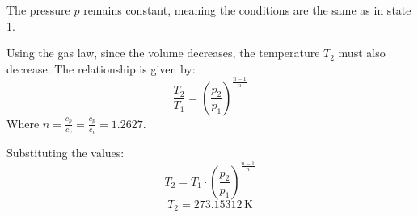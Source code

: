 The pressure \( p \) remains constant, meaning the conditions are the same as in state 1.  

Using the gas law, since the volume decreases, the temperature \( T_2 \) must also decrease. The relationship is given by:  
\[
\frac{T_2}{T_1} = \left(\frac{p_2}{p_1}\right)^{\frac{n-1}{n}}
\]  
Where \( n = \frac{c_p}{c_v} = \frac{c_p}{c_v} = 1.2627 \).  

Substituting the values:  
\[
T_2 = T_1 \cdot \left(\frac{p_2}{p_1}\right)^{\frac{n-1}{n}}
\]  
\[
T_2 = 273.15312 \, \text{K}
\]